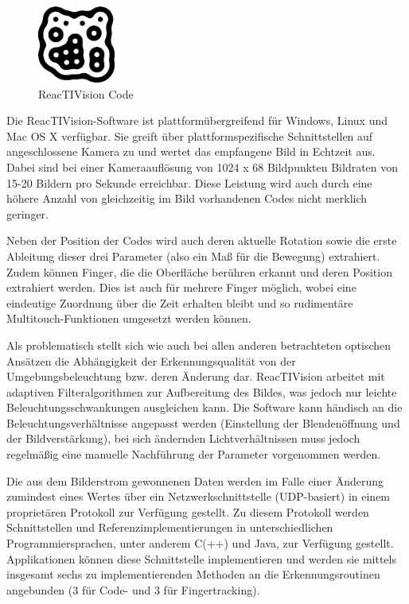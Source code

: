 \begin{figure}[htbp]
	\centering
		\includegraphics[height=1in]{img/ImplementierungInput/ReactivisionCode.png}
	\caption{ReacTIVision Code}
	\label{fig:img_ImplementierungInput_ReactivisionCode}
\end{figure}

Die ReacTIVision-Software ist plattformübergreifend für Windows, Linux und Mac OS X verfügbar. Sie greift über plattformspezifische Schnittstellen auf angeschlossene Kamera zu und wertet das empfangene Bild in Echtzeit aus. Dabei sind bei einer Kameraauflösung von 1024 x 68 Bildpunkten Bildraten von 15-20 Bildern pro Sekunde erreichbar. Diese Leistung wird auch durch eine höhere Anzahl von gleichzeitig im Bild vorhandenen Codes nicht merklich geringer.

Neben der Position der Codes wird auch deren aktuelle Rotation sowie die erste Ableitung dieser drei Parameter (also ein Maß für die Bewegung) extrahiert. Zudem können Finger, die die Oberfläche berühren erkannt und deren Position extrahiert werden. Dies ist auch für mehrere Finger möglich, wobei eine eindeutige Zuordnung über die Zeit erhalten bleibt und so rudimentäre Multitouch-Funktionen umgesetzt werden können.

Als problematisch stellt sich wie auch bei allen anderen betrachteten optischen Ansätzen die Abhängigkeit der Erkennungsqualität von der Umgebungsbeleuchtung bzw. deren Änderung dar. ReacTIVision arbeitet mit adaptiven Filteralgorithmen zur Aufbereitung des Bildes, was jedoch nur leichte Beleuchtungsschwankungen ausgleichen kann. Die Software kann händisch an die Beleuchtungsverhältnisse angepasst werden (Einstellung der Blendenöffnung und der Bildverstärkung), bei sich ändernden Lichtverhältnissen muss jedoch regelmäßig eine manuelle Nachführung der Parameter vorgenommen werden.

Die aus dem Bilderstrom gewonnenen Daten werden im Falle einer Änderung zumindest eines Wertes über ein Netzwerkschnittstelle (UDP-basiert) in einem proprietären Protokoll zur Verfügung gestellt. Zu diesem Protokoll werden Schnittstellen und Referenzimplementierungen in unterschiedlichen Programmiersprachen, unter anderem C(++) und Java, zur Verfügung gestellt. Applikationen können diese Schnittstelle implementieren und werden sie mittels insgesamt sechs zu implementierenden Methoden an die Erkennungsroutinen angebunden (3 für Code- und 3 für Fingertracking).

